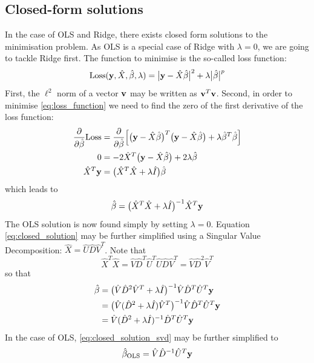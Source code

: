 \documentclass[reprint,english]{revtex4-1}
\begin{document}
\subsection{Closed-form solutions}
In the case of OLS and Ridge, there exists closed form solutions to the minimisation problem. As OLS is a special case of Ridge with \(\lambda=0\), we are going to tackle Ridge first. The function to minimise is the so-called loss function:
\begin{equation}\label{eq:loss_function}
\text{Loss}(\vb{y},\hat{X},\hat{\beta},\lambda)=\big|\vb{y}-\hat{X}\hat{\beta}\big|^2+\lambda\big|\hat{\beta}\big|^p
\end{equation}
First, the \(\ell^2\) norm of a vector \(\vb{v}\) may be written as \(\vb{v}^T\vb{v}\). Second, in order to minimise \eqref{eq:loss_function} we need to find the zero of the first derivative of the loss function:
\begin{align*}
\pdv{\hat{\beta}}\text{Loss}&=\pdv{\hat{\beta}}\Big[\big(\vb{y}-\hat{X}\hat{\beta}\big)^T\big(\vb{y}-\hat{X}\hat{\beta}\big)+\lambda\hat{\beta}^T\hat{\beta}\Big]\\
0&=-2\hat{X}^T\big(\vb{y}-\hat{X}\hat{\beta}\big)+2\lambda\hat{\beta}\\
\hat{X}^T\vb{y}&=\big(\hat{X}^T\hat{X}+\lambda\hat{I}\big)\hat{\beta}
\end{align*}
which leads to
\begin{equation}\label{eq:closed_solution}
\hat{\beta}=\big(\hat{X}^T\hat{X}+\lambda\hat{I}\big)^{-1}\hat{X}^T\vb{y}
\end{equation}
The OLS solution is now found simply by setting \(\lambda=0\). Equation \eqref{eq:closed_solution} may be further simplified using a Singular Value Decomposition: \(\hat{X}=\hat{U}\hat{D}\hat{V}^T\). Note that
\[\hat{X}^T\hat{X}=\hat{V}\hat{D}^T\hat{U}^T\hat{U}\hat{D}\hat{V}^T=\hat{V}\hat{D}^2\hat{V}^T\]
so that
\begin{align}
\hat{\beta}&=\big(\hat{V}\hat{D}^2\hat{V}^T+\lambda\hat{I}\big)^{-1}\hat{V}\hat{D}^T\hat{U}^T\vb{y}\nonumber\\
&=\big(\hat{V}(\hat{D}^2+\lambda\hat{I})\hat{V}^T\big)^{-1}\hat{V}\hat{D}^T\hat{U}^T\vb{y}\nonumber\\
&=\hat{V}(\hat{D}^2+\lambda\hat{I})^{-1}\hat{D}^T\hat{U}^T\vb{y}\label{eq:closed_solution_svd}
\end{align}
In the case of OLS, \eqref{eq:closed_solution_svd} may be further simplified to
\begin{equation}
\hat{\beta}_\text{OLS}=\hat{V}\hat{D}^{-1}\hat{U}^T\vb{y}
\end{equation}
\end{document}
